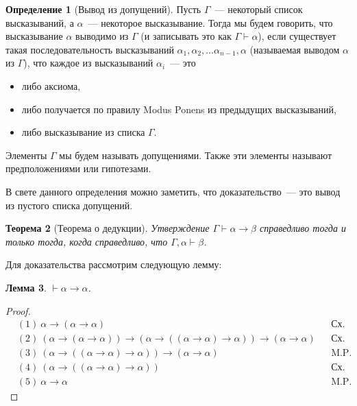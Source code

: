 \documentclass[a4paper,11pt]{article}
\newtheorem{thm}{Теорема}[section]
\newtheorem{lmm}[thm]{Лемма}
\theoremstyle{definition}
\newtheorem{dfn}[thm]{Определение}
\newcommand{\proves}{\vdash}
\begin{document}
\begin{dfn}[Вывод из допущений]
Пусть $\Gamma$~--- некоторый список высказываний, а $\alpha$~--- некоторое
высказывание. Тогда мы будем говорить, что высказывание $\alpha$ выводимо из
$\Gamma$ (и записывать это как $\Gamma \proves \alpha$), если существует такая
последовательность высказываний $\alpha_1, \alpha_2, \dots \alpha_{n-1},
\alpha$ (называемая выводом $\alpha$ из $\Gamma$), что каждое из высказываний
$\alpha_i$~--- это
\begin{itemize}
\item либо аксиома,
\item либо получается по правилу Modus Ponens из предыдущих высказываний,
\item либо высказывание из списка $\Gamma$.
\end{itemize}
Элементы $\Gamma$ мы будем называть допущениями. Также эти элементы называют
предположениями или гипотезами.
\end{dfn}

В свете данного определения можно заметить, что доказательство~--- это вывод из
пустого списка допущений.

\begin{thm}[Теорема о дедукции]
Утверждение $\Gamma \proves \alpha \to \beta$ справедливо тогда и только тогда,
когда справедливо, что $\Gamma, \alpha \proves \beta$.
\end{thm}

Для доказательства рассмотрим следующую лемму:

\begin{lmm}
$\proves \alpha \to \alpha$.
\end{lmm}
\begin{proof}
\begin{align*}
&(1)\ \alpha \to (\alpha \to \alpha) &&\text{Сх. акс. 1}\\
&(2)\ (\alpha \to (\alpha \to \alpha)) \to (\alpha \to ((\alpha \to \alpha) \to \alpha)) \to (\alpha \to \alpha) &&\text{Сх. акс. 2}\\
&(3)\ (\alpha \to ((\alpha \to \alpha) \to \alpha)) \to (\alpha \to \alpha) &&\text{M.P. 1,2}\\
&(4)\ (\alpha \to ((\alpha \to \alpha) \to \alpha)) &&\text{Сх. акс. 1}\\
&(5)\ \alpha \to \alpha &&\text{M.P. 4,3}
\end{align*}
\end{proof}
\end{document}
